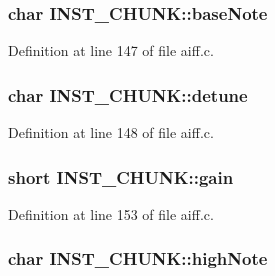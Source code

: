 \subsubsection[{\texorpdfstring{base\+Note}{baseNote}}]{\setlength{\rightskip}{0pt plus 5cm}char I\+N\+S\+T\+\_\+\+C\+H\+U\+N\+K\+::base\+Note}\hypertarget{struct_i_n_s_t___c_h_u_n_k_a0068555f5659374b12d7c60d2336b367}{}\label{struct_i_n_s_t___c_h_u_n_k_a0068555f5659374b12d7c60d2336b367}


Definition at line 147 of file aiff.\+c.

\subsubsection[{\texorpdfstring{detune}{detune}}]{\setlength{\rightskip}{0pt plus 5cm}char I\+N\+S\+T\+\_\+\+C\+H\+U\+N\+K\+::detune}\hypertarget{struct_i_n_s_t___c_h_u_n_k_a8dd7080b2e8d4c805c2298d3f62ec2f4}{}\label{struct_i_n_s_t___c_h_u_n_k_a8dd7080b2e8d4c805c2298d3f62ec2f4}


Definition at line 148 of file aiff.\+c.

\subsubsection[{\texorpdfstring{gain}{gain}}]{\setlength{\rightskip}{0pt plus 5cm}short I\+N\+S\+T\+\_\+\+C\+H\+U\+N\+K\+::gain}\hypertarget{struct_i_n_s_t___c_h_u_n_k_a60e33b42c98ae62484d1542176dc7cf0}{}\label{struct_i_n_s_t___c_h_u_n_k_a60e33b42c98ae62484d1542176dc7cf0}


Definition at line 153 of file aiff.\+c.

\subsubsection[{\texorpdfstring{high\+Note}{highNote}}]{\setlength{\rightskip}{0pt plus 5cm}char I\+N\+S\+T\+\_\+\+C\+H\+U\+N\+K\+::high\+Note}\hypertarget{struct_i_n_s_t___c_h_u_n_k_a076924bdcc602027bbcdd35dce87b90a}{}\label{struct_i_n_s_t___c_h_u_n_k_a076924bdcc602027bbcdd35dce87b90a}


